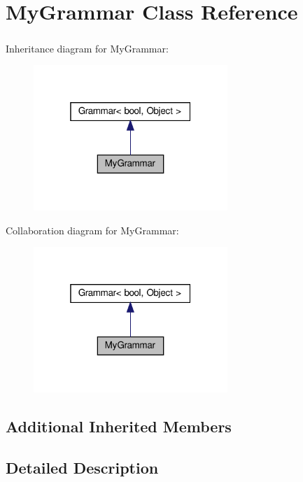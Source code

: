 \hypertarget{class_my_grammar}{}\section{My\+Grammar Class Reference}
\label{class_my_grammar}


\subparagraph*{} 




Inheritance diagram for My\+Grammar\+:\nopagebreak
\begin{figure}[H]
\begin{center}
\leavevmode
\includegraphics[width=208pt]{class_my_grammar__inherit__graph}
\end{center}
\end{figure}


Collaboration diagram for My\+Grammar\+:
\nopagebreak
\begin{figure}[H]
\begin{center}
\leavevmode
\includegraphics[width=208pt]{class_my_grammar__coll__graph}
\end{center}
\end{figure}
\subsection*{Additional Inherited Members}


\subsection{Detailed Description}
\subparagraph*{}

